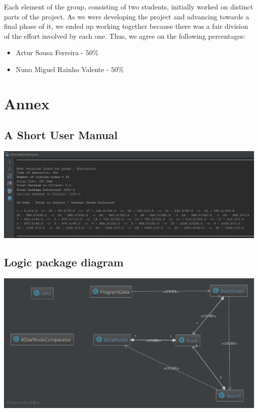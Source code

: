 \documentclass[a4paper]{article}
\begin{document}
Each element of the group, consisting of two students, initially worked on distinct parts of the project. As we were developing the project and advancing towards a final phase of it, we ended up working together because there was a fair division of the effort involved by each one. Thus, we agree on the following percentages:

\begin{itemize}
	
	\item Artur Sousa Ferreira - $50\%$
	\item Nuno Miguel Rainho Valente - $50\%$
	
\end{itemize}

\newpage
\appendix

\section{Annex}\label{annex}
\subsection{A Short User Manual}

\begin{center}
	\includegraphics[scale=0.75]{console_statistics.png}
\end{center}
	
\subsection{Logic package diagram}\label{lpdUML}

\begin{center}
\includegraphics[scale=0.5]{../../diagrams/package_logic_diagram.png}
\end{center}
\end{document}
